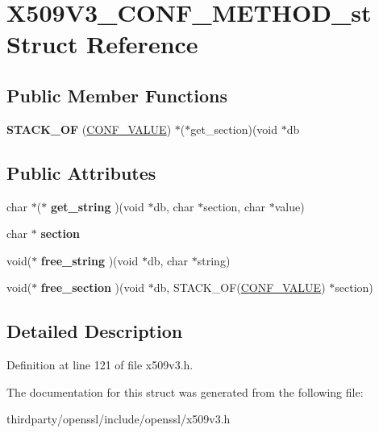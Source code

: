 \hypertarget{struct_x509_v3___c_o_n_f___m_e_t_h_o_d__st}{}\section{X509\+V3\+\_\+\+C\+O\+N\+F\+\_\+\+M\+E\+T\+H\+O\+D\+\_\+st Struct Reference}
\label{struct_x509_v3___c_o_n_f___m_e_t_h_o_d__st}
\subsection*{Public Member Functions}
\begin{DoxyCompactItemize}
\item 
\mbox{\label{struct_x509_v3___c_o_n_f___m_e_t_h_o_d__st_a77d6d5e2d94f1c44e4b19c3810de4f15}} 
{\bfseries S\+T\+A\+C\+K\+\_\+\+OF} (\hyperlink{struct_c_o_n_f___v_a_l_u_e}{C\+O\+N\+F\+\_\+\+V\+A\+L\+UE}) $\ast$($\ast$get\+\_\+section)(void $\ast$db
\end{DoxyCompactItemize}
\subsection*{Public Attributes}
\begin{DoxyCompactItemize}
\item 
\mbox{\label{struct_x509_v3___c_o_n_f___m_e_t_h_o_d__st_a122df56f2ef2704b4362b5767c3571c0}} 
char $\ast$($\ast$ {\bfseries get\+\_\+string} )(void $\ast$db, char $\ast$section, char $\ast$value)
\item 
\mbox{\label{struct_x509_v3___c_o_n_f___m_e_t_h_o_d__st_ac0685c3b398f0093e4d5c44c90259ac4}} 
char $\ast$ {\bfseries section}
\item 
\mbox{\label{struct_x509_v3___c_o_n_f___m_e_t_h_o_d__st_aaebdc3bd7c731ad447fc1abb8f4a6bd8}} 
void($\ast$ {\bfseries free\+\_\+string} )(void $\ast$db, char $\ast$string)
\item 
\mbox{\label{struct_x509_v3___c_o_n_f___m_e_t_h_o_d__st_a21948ec56fcb45c64ee5e59ddc3c6306}} 
void($\ast$ {\bfseries free\+\_\+section} )(void $\ast$db, S\+T\+A\+C\+K\+\_\+\+OF(\hyperlink{struct_c_o_n_f___v_a_l_u_e}{C\+O\+N\+F\+\_\+\+V\+A\+L\+UE}) $\ast$section)
\end{DoxyCompactItemize}


\subsection{Detailed Description}


Definition at line 121 of file x509v3.\+h.



The documentation for this struct was generated from the following file\+:\begin{DoxyCompactItemize}
\item 
thirdparty/openssl/include/openssl/x509v3.\+h\end{DoxyCompactItemize}
